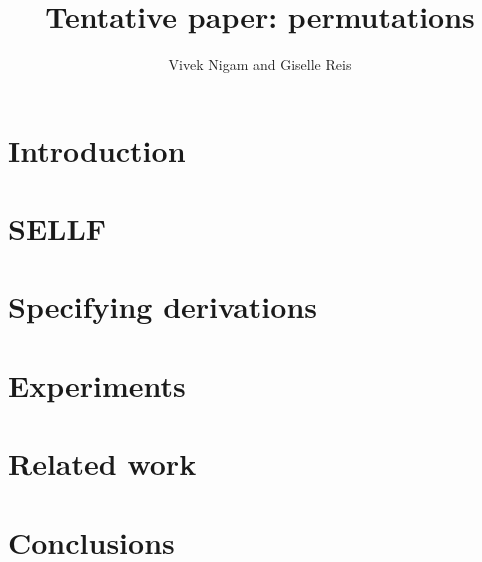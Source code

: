 \documentclass[a4paper, 11pt]{llncs}
\title{Tentative paper: permutations}
\author{Vivek Nigam and Giselle Reis}
\begin{document}
\maketitle

\begin{abstract}

\end{abstract}

\section{Introduction}


\section{SELLF}
%


\section{Specifying derivations}




\section{Experiments}


\section{Related work}
%

\section{Conclusions}
%

\appendix
%


\end{document}
